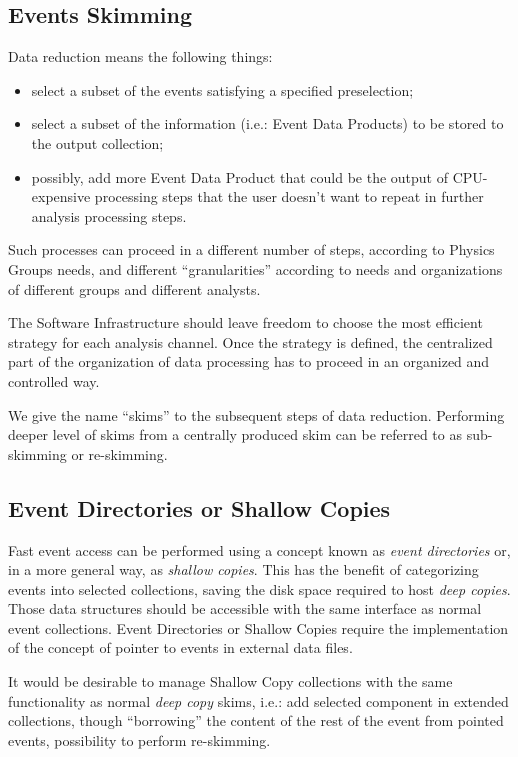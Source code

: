 \documentclass[draftmode]{memarticle}
\begin{document}
\subsection{Events Skimming}

Data reduction means the following things:
\begin{itemize}
\item{} select a subset of the events satisfying a specified preselection;
\item{} select a subset of the information (i.e.: Event Data Products)
to be stored to the output collection;
\item{} possibly, add more Event Data Product that could 
be the output of CPU-expensive processing steps that the user
doesn't want to repeat in further analysis processing steps.
\end{itemize}
Such processes can proceed in a different number of steps, according
to Physics Groups needs, and different ``granularities'' according
to needs and organizations of different groups and different analysts.

The Software Infrastructure should leave freedom to choose the most
efficient strategy for each analysis channel. Once the strategy is defined, 
the centralized part of the organization of data processing
has to proceed in an organized and controlled way.

We give the name ``skims'' to the subsequent steps of data reduction.
Performing deeper level of skims from a centrally produced skim can be
referred to as sub-skimming or re-skimming.

\subsection{Event Directories or Shallow Copies}

Fast event access can be performed using a concept known 
as {\em event directories} or, in a more general way, as 
{\em shallow copies}. This has the benefit of categorizing
events into selected collections, saving the disk space 
required to host {\em deep copies}. Those
data structures should be accessible with the same interface
as normal event collections. Event Directories or Shallow Copies
require the implementation of the concept of pointer to events in 
external data files. 

It would be desirable to manage Shallow Copy collections with the
same functionality as normal {\em deep copy} skims, i.e.: add 
selected component in extended collections, though ``borrowing''
the content of the rest of the event from pointed events, possibility
to perform re-skimming.
\end{document}
